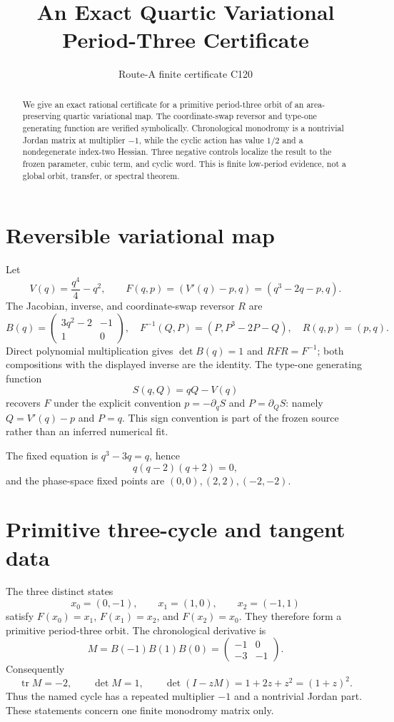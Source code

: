 \documentclass[10pt]{article}
\title{An Exact Quartic Variational Period-Three Certificate}
\author{Route-A finite certificate C120}
\date{}
\begin{document}
\maketitle
\begin{abstract}
We give an exact rational certificate for a primitive period-three orbit of an
area-preserving quartic variational map.  The coordinate-swap reversor and
type-one generating function are verified symbolically.  Chronological
monodromy is a nontrivial Jordan matrix at multiplier $-1$, while the cyclic
action has value $1/2$ and a nondegenerate index-two Hessian.  Three negative
controls localize the result to the frozen parameter, cubic term, and cyclic
word.  This is finite low-period evidence, not a global orbit, transfer, or
spectral theorem.
\end{abstract}

\section{Reversible variational map}
Let
\[
 V(q)=\frac{q^4}{4}-q^2,\qquad
 F(q,p)=(V'(q)-p,q)=(q^3-2q-p,q).
\]
The Jacobian, inverse, and coordinate-swap reversor $R$ are
\[
 B(q)=\begin{pmatrix}3q^2-2&-1\\1&0\end{pmatrix},\quad
 F^{-1}(Q,P)=(P,P^3-2P-Q),\quad R(q,p)=(p,q).
\]
Direct polynomial multiplication gives $\det B(q)=1$ and
$RFR=F^{-1}$; both compositions with the displayed inverse are the identity.
The type-one generating function
\[
 S(q,Q)=qQ-V(q)
\]
recovers $F$ under the explicit convention $p=-\partial_qS$ and
$P=\partial_QS$: namely $Q=V'(q)-p$ and $P=q$.  This sign convention is part
of the frozen source rather than an inferred numerical fit.

The fixed equation is $q^3-3q=q$, hence
\[
 q(q-2)(q+2)=0,
\]
and the phase-space fixed points are $(0,0),(2,2),(-2,-2)$.

\section{Primitive three-cycle and tangent data}
The three distinct states
\[
 x_0=(0,-1),\qquad x_1=(1,0),\qquad x_2=(-1,1)
\]
satisfy $F(x_0)=x_1$, $F(x_1)=x_2$, and $F(x_2)=x_0$.  They therefore form
a primitive period-three orbit.  The chronological derivative is
\[
 M=B(-1)B(1)B(0)
 =\begin{pmatrix}-1&0\\-3&-1\end{pmatrix}.
\]
Consequently
\[
 \operatorname{tr}M=-2,\qquad \det M=1,\qquad
 \det(I-zM)=1+2z+z^2=(1+z)^2.
\]
Thus the named cycle has a repeated multiplier $-1$ and a nontrivial Jordan
part.  These statements concern one finite monodromy matrix only.
\end{document}
